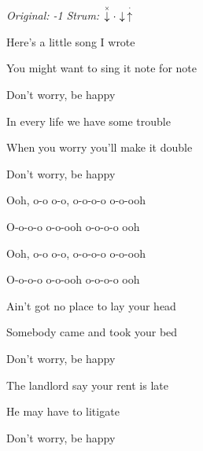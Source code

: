 \begin{song}


\begin{headerbox}
\RaiseBoxWithAccents
{} \quad
\textit{Original: -1} \quad
\textit{Strum:} $\ChuckDown\Miss\Down\StaccatoUp$ 
\end{headerbox}


\begin{strumbox}
\end{strumbox}

\bigskip

\Large

 Here's a little song I wrote \par
You might want to sing it note for note \par
Don't worry, be happy \par

\bigskip

 In every life we have some trouble \par
{} When you worry you'll make it double \par
Don't worry, be happy  \par

\bigskip

\begin{chorusboxwide}{\Chorus}
Ooh, o-o o-o, o-o-o-o o-o-ooh  \par
O-o-o-o o-o-ooh  o-o-o-o ooh  \par
{}Ooh, o-o o-o, o-o-o-o o-o-ooh  \par
O-o-o-o o-o-ooh  o-o-o-o ooh  \par
\end{chorusboxwide}

\bigskip

 Ain't got no place to lay your head \par
{} Somebody came and took your bed \par
Don't worry, be happy \par

\bigskip

The landlord say your rent is late \par
{} He may have to litigate \par
Don't worry, be happy \par


\end{song}
